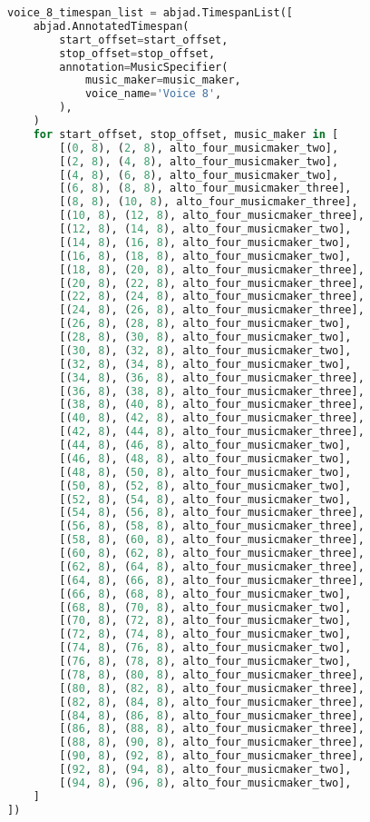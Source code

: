 \begin{lstlisting}[language=Python, caption=Invocation Source Code]
voice_8_timespan_list = abjad.TimespanList([
    abjad.AnnotatedTimespan(
        start_offset=start_offset,
        stop_offset=stop_offset,
        annotation=MusicSpecifier(
            music_maker=music_maker,
            voice_name='Voice 8',
        ),
    )
    for start_offset, stop_offset, music_maker in [
        [(0, 8), (2, 8), alto_four_musicmaker_two],
        [(2, 8), (4, 8), alto_four_musicmaker_two],
        [(4, 8), (6, 8), alto_four_musicmaker_two],
        [(6, 8), (8, 8), alto_four_musicmaker_three],
        [(8, 8), (10, 8), alto_four_musicmaker_three],
        [(10, 8), (12, 8), alto_four_musicmaker_three],
        [(12, 8), (14, 8), alto_four_musicmaker_two],
        [(14, 8), (16, 8), alto_four_musicmaker_two],
        [(16, 8), (18, 8), alto_four_musicmaker_two],
        [(18, 8), (20, 8), alto_four_musicmaker_three],
        [(20, 8), (22, 8), alto_four_musicmaker_three],
        [(22, 8), (24, 8), alto_four_musicmaker_three],
        [(24, 8), (26, 8), alto_four_musicmaker_three],
        [(26, 8), (28, 8), alto_four_musicmaker_two],
        [(28, 8), (30, 8), alto_four_musicmaker_two],
        [(30, 8), (32, 8), alto_four_musicmaker_two],
        [(32, 8), (34, 8), alto_four_musicmaker_two],
        [(34, 8), (36, 8), alto_four_musicmaker_three],
        [(36, 8), (38, 8), alto_four_musicmaker_three],
        [(38, 8), (40, 8), alto_four_musicmaker_three],
        [(40, 8), (42, 8), alto_four_musicmaker_three],
        [(42, 8), (44, 8), alto_four_musicmaker_three],
        [(44, 8), (46, 8), alto_four_musicmaker_two],
        [(46, 8), (48, 8), alto_four_musicmaker_two],
        [(48, 8), (50, 8), alto_four_musicmaker_two],
        [(50, 8), (52, 8), alto_four_musicmaker_two],
        [(52, 8), (54, 8), alto_four_musicmaker_two],
        [(54, 8), (56, 8), alto_four_musicmaker_three],
        [(56, 8), (58, 8), alto_four_musicmaker_three],
        [(58, 8), (60, 8), alto_four_musicmaker_three],
        [(60, 8), (62, 8), alto_four_musicmaker_three],
        [(62, 8), (64, 8), alto_four_musicmaker_three],
        [(64, 8), (66, 8), alto_four_musicmaker_three],
        [(66, 8), (68, 8), alto_four_musicmaker_two],
        [(68, 8), (70, 8), alto_four_musicmaker_two],
        [(70, 8), (72, 8), alto_four_musicmaker_two],
        [(72, 8), (74, 8), alto_four_musicmaker_two],
        [(74, 8), (76, 8), alto_four_musicmaker_two],
        [(76, 8), (78, 8), alto_four_musicmaker_two],
        [(78, 8), (80, 8), alto_four_musicmaker_three],
        [(80, 8), (82, 8), alto_four_musicmaker_three],
        [(82, 8), (84, 8), alto_four_musicmaker_three],
        [(84, 8), (86, 8), alto_four_musicmaker_three],
        [(86, 8), (88, 8), alto_four_musicmaker_three],
        [(88, 8), (90, 8), alto_four_musicmaker_three],
        [(90, 8), (92, 8), alto_four_musicmaker_three],
        [(92, 8), (94, 8), alto_four_musicmaker_two],
        [(94, 8), (96, 8), alto_four_musicmaker_two],
    ]
])


\end{lstlisting}
